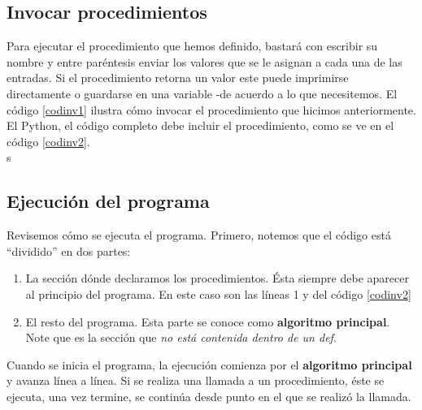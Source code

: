 \newpage




\subsection{Invocar procedimientos}

Para ejecutar el procedimiento que hemos definido, bastará con escribir su nombre y entre paréntesis enviar los valores que se le asignan a cada una de las entradas. Si el procedimiento retorna un valor este puede imprimirse directamente o guardarse en una variable -de acuerdo a lo que necesitemos. El código \ref{codinv1} ilustra cómo invocar el procedimiento que hicimos anteriormente. \\



El Python, el código completo debe incluir el procedimiento, como se ve en el código \ref{codinv2}. \\s



\subsection{Ejecución del programa}

Revisemos cómo se ejecuta el programa. Primero, notemos que el código está ``dividido'' en dos partes:

\begin{enumerate}
\item La sección dónde declaramos los procedimientos. Ésta siempre debe aparecer al principio del programa. En este caso son las líneas 1 y del código \ref{codinv2}

\item El resto del programa. Esta parte se conoce como \textbf{algoritmo principal}. Note que es la sección que \emph{no está contenida dentro de un def}.
\end{enumerate}

Cuando se inicia el programa, la ejecución comienza por el \textbf{algoritmo principal} y avanza línea a línea. Si se realiza una llamada a un procedimiento, éste se ejecuta, una vez termine, se continúa desde punto en el que se realizó la llamada.

